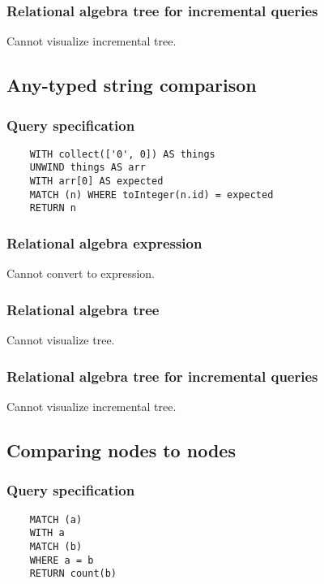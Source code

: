 	\subsubsection*{Relational algebra tree for incremental queries}

	Cannot visualize incremental tree.
	\subsection{Any-typed string comparison}

	\subsubsection*{Query specification}

	\begin{lstlisting}
	WITH collect(['0', 0]) AS things
	UNWIND things AS arr
	WITH arr[0] AS expected
	MATCH (n) WHERE toInteger(n.id) = expected
	RETURN n
	\end{lstlisting}


	\subsubsection*{Relational algebra expression}

	Cannot convert to expression.

	\subsubsection*{Relational algebra tree}

	Cannot visualize tree.

	\subsubsection*{Relational algebra tree for incremental queries}

	Cannot visualize incremental tree.
	\subsection{Comparing nodes to nodes}

	\subsubsection*{Query specification}

	\begin{lstlisting}
	MATCH (a)
	WITH a
	MATCH (b)
	WHERE a = b
	RETURN count(b)
	\end{lstlisting}


